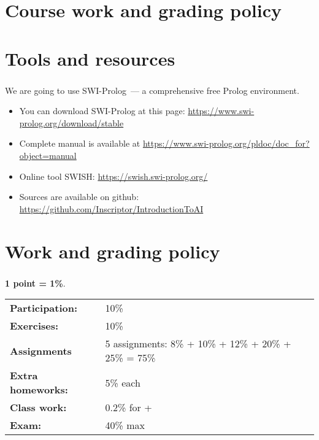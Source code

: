 \frame[plain]{\titlepage}


\section{Course work and grading policy}

\section{Tools and resources}

\begin{frame}
	\frametitle{\insertsection}
	We are going to use SWI-Prolog~--- a comprehensive free Prolog environment.
	\begin{itemize}
		\item You can download SWI-Prolog at this page: \href{https://www.swi-prolog.org/download/stable}{https://www.swi-prolog.org/download/stable}
		\item Complete manual is available at \href{https://www.swi-prolog.org/pldoc/doc\_for?object=manual}{https://www.swi-prolog.org/pldoc/doc\_for?object=manual}
		\item Online tool SWISH: \href{https://swish.swi-prolog.org/}{https://swish.swi-prolog.org/}
		\item Sources are available on github: \href{https://github.com/Inscriptor/IntroductionToAI}{https://github.com/Inscriptor/IntroductionToAI}
	\end{itemize}
\end{frame}


\section{Work and grading policy}

\begin{frame}
	\frametitle{\insertsection}
	
	\textbf{1 point = 1\%}.
	
	\bgroup
	\def\arraystretch{1.5}
		\begin{tabular}{ll}
			\textbf{Participation:} & 10\% \\
			\textbf{Exercises:} & 10\% \\
			\textbf{Assignments} & 5 assignments: 8\% + 10\% + 12\% + 20\% + 25\% = 75\% \\
			\textbf{Extra homeworks:} & 5\% each \\
			\textbf{Class work:} & 0.2\% for + \\
			\textbf{Exam:} & 40\% max
		\end{tabular}
	\egroup
\end{frame}

